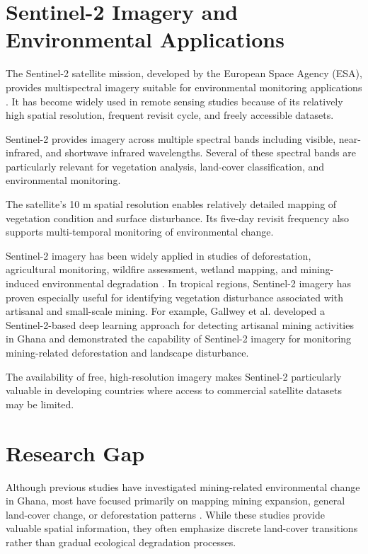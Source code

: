 \documentclass[a4paper,12pt]{report}
\begin{document}
\section{Sentinel-2 Imagery and Environmental Applications}

The Sentinel-2 satellite mission, developed by the European Space Agency (ESA), provides multispectral imagery suitable for environmental monitoring applications \citep{drusch2012sentinel,esa2024sentinel2}. It has become widely used in remote sensing studies because of its relatively high spatial resolution, frequent revisit cycle, and freely accessible datasets.

Sentinel-2 provides imagery across multiple spectral bands including visible, near-infrared, and shortwave infrared wavelengths. Several of these spectral bands are particularly relevant for vegetation analysis, land-cover classification, and environmental monitoring.

The satellite’s 10 m spatial resolution enables relatively detailed mapping of vegetation condition and surface disturbance. Its five-day revisit frequency also supports multi-temporal monitoring of environmental change.

Sentinel-2 imagery has been widely applied in studies of deforestation, agricultural monitoring, wildfire assessment, wetland mapping, and mining-induced environmental degradation \citep{forkuor2012comparison}. In tropical regions, Sentinel-2 imagery has proven especially useful for identifying vegetation disturbance associated with artisanal and small-scale mining. For example, Gallwey et al. \citep{gallwey2020sentinel} developed a Sentinel-2-based deep learning approach for detecting artisanal mining activities in Ghana and demonstrated the capability of Sentinel-2 imagery for monitoring mining-related deforestation and landscape disturbance.

The availability of free, high-resolution imagery makes Sentinel-2 particularly valuable in developing countries where access to commercial satellite datasets may be limited.


\section{Research Gap}

Although previous studies have investigated mining-related environmental change in Ghana, most have focused primarily on mapping mining expansion, general land-cover change, or deforestation patterns \citep{awotwi2018pra,gallwey2020sentinel}. While these studies provide valuable spatial information, they often emphasize discrete land-cover transitions rather than gradual ecological degradation processes.
\end{document}
